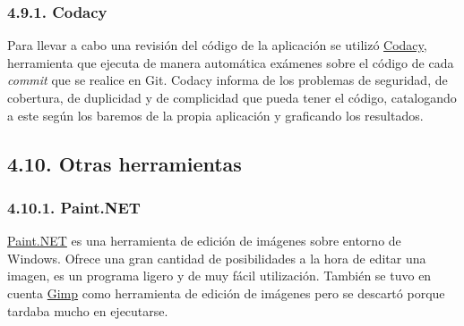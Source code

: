 \subsubsection{4.9.1. Codacy}

Para llevar a cabo una revisión del código de la aplicación se utilizó \href{https://www.codacy.com/}{Codacy}, herramienta que ejecuta de manera automática exámenes sobre el código de cada \textit{commit} que se realice en Git. Codacy informa de los problemas de seguridad, de cobertura, de duplicidad y de complicidad que pueda tener el código, catalogando a este según los baremos de la propia aplicación y graficando los resultados.


\subsection{4.10. Otras herramientas}

\subsubsection{4.10.1. Paint.NET}

\href{https://www.getpaint.net/index.html}{Paint.NET} es una herramienta de edición de imágenes sobre entorno de Windows. Ofrece una gran cantidad de posibilidades a la hora de editar una imagen, es un programa ligero y de muy fácil utilización. También se tuvo en cuenta \href{http://www.gimp.org.es/}{Gimp} como herramienta de edición de imágenes pero se descartó porque tardaba mucho en ejecutarse.
